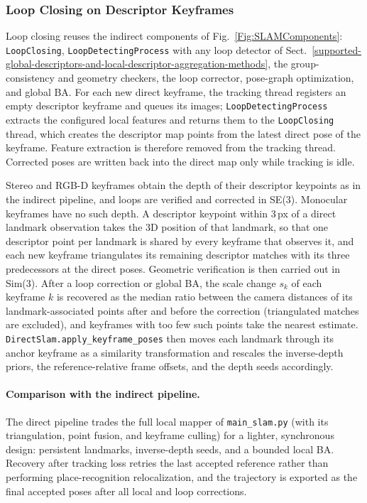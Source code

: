 \documentclass{article}
\let\oldparagraph\paragraph
\renewcommand{\paragraph}[1]{\oldparagraph{#1}\mbox{}}
\begin{document}
\subsubsection{Loop Closing on Descriptor Keyframes}

Loop closing reuses the indirect components of Fig.~\ref{Fig:SLAMComponents}: \texttt{LoopClosing}, \texttt{LoopDetectingProcess} with any loop detector of Sect.~\ref{supported-global-descriptors-and-local-descriptor-aggregation-methods}, the group-consistency and geometry checkers, the loop corrector, pose-graph optimization, and global BA. For each new direct keyframe, the tracking thread registers an empty descriptor keyframe and queues its images; \texttt{LoopDetectingProcess} extracts the configured local features and returns them to the \texttt{LoopClosing} thread, which creates the descriptor map points from the latest direct pose of the keyframe. Feature extraction is therefore removed from the tracking thread. Corrected poses are written back into the direct map only while tracking is idle.

Stereo and RGB-D keyframes obtain the depth of their descriptor keypoints as in the indirect pipeline, and loops are verified and corrected in SE(3). Monocular keyframes have no such depth. A descriptor keypoint within 3\,px of a direct landmark observation takes the 3D position of that landmark, so that one descriptor point per landmark is shared by every keyframe that observes it, and each new keyframe triangulates its remaining descriptor matches with its three predecessors at the direct poses. Geometric verification is then carried out in Sim(3). After a loop correction or global BA, the scale change $s_k$ of each keyframe $k$ is recovered as the median ratio between the camera distances of its landmark-associated points after and before the correction (triangulated matches are excluded), and keyframes with too few such points take the nearest estimate. \texttt{DirectSlam.apply\_keyframe\_poses} then moves each landmark through its anchor keyframe as a similarity transformation and rescales the inverse-depth priors, the reference-relative frame offsets, and the depth seeds accordingly.

\paragraph{Comparison with the indirect pipeline.} The direct pipeline trades the full local mapper of \texttt{main\_slam.py} (with its triangulation, point fusion, and keyframe culling) for a lighter, synchronous design: persistent landmarks, inverse-depth seeds, and a bounded local BA. Recovery after tracking loss retries the last accepted reference rather than performing place-recognition relocalization, and the trajectory is exported as the final accepted poses after all local and loop corrections.
\end{document}
